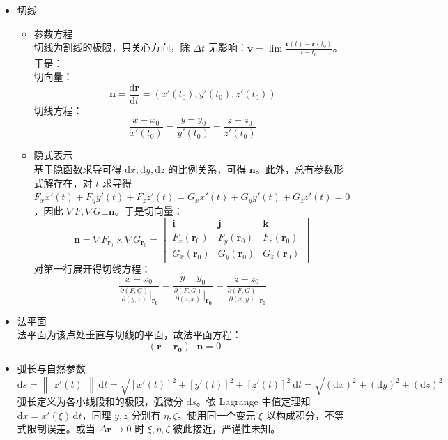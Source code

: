 \documentclass[12pt, a4paper, UTF8, openany]{ctexbook}
\newcommand{\dif}{\mathrm{d}}
\newcommand{\mat}[1]{\mathbf{#1}}
\newcommand{\len}[1]{\begin{Vmatrix}#1\end{Vmatrix}}%
\begin{document}
        \begin{itemize}
            \item 切线
            \begin{itemize}
                \item 参数方程 \\
                切线为割线的极限，只关心方向，除 $\Delta t$ 无影响：$\mat{v} = \lim \frac{\mat{r}(t) - \mat{r}(t_0)}{t - t_0}$。于是：\\
                切向量：
                $$\mat{n} = \frac{\dif \mat{r}}{\dif t} = (x'(t_0), y'(t_0), z'(t_0))$$
                切线方程：
                $$\frac{x - x_0}{x'(t_0)} = \frac{y - y_0}{y'(t_0)} = \frac{z - z_0}{z'(t_0)}$$
                \item 隐式表示 \\
                基于隐函数求导可得 $\dif x, \dif y, \dif z$ 的比例关系，可得 $\mat{n}$。此外，总有参数形式解存在，对 $t$ 求导得 $F_x x'(t) + F_y y'(t) + F_z z'(t) = G_x x'(t) + G_y y'(t) + G_z z'(t) = 0$，因此 $\nabla F, \nabla G \bot \mat{n}$。于是切向量：
                $$\mat{n} = \nabla F_{\mat{r}_0} \times \nabla G_{\mat{r}_0} = \begin{vmatrix}
                    \mat{i} & \mat{j} & \mat{k} \\
                    F_x(\mat{r}_0) & F_y(\mat{r}_0) & F_z(\mat{r}_0) \\
                    G_x(\mat{r}_0) & G_y(\mat{r}_0) & G_z(\mat{r}_0)
                \end{vmatrix}$$
                对第一行展开得切线方程：
                $$\dfrac{x - x_0}{\frac{\partial (F, G)}{\partial (y, z)}|_{\mat{r_0}}} = \dfrac{y - y_0}{\frac{\partial (F, G)}{\partial (z, x)}|_{\mat{r_0}}} = \dfrac{z - z_0}{\frac{\partial (F, G)}{\partial (x, y)}|_{\mat{r_0}}}$$
            \end{itemize}

            \item 法平面 \\
            法平面为该点处垂直与切线的平面，故法平面方程：
            $$(\mat{r} - \mat{r_0}) \cdot \mat{n} = 0$$
            
            \item 弧长与自然参数
            $$\dif s = \len{\mat{r}'(t)} \,\dif t = \sqrt{[x'(t)]^2 + [y'(t)]^2 + [z'(t)]^2} \,\dif t = \sqrt{(\dif x)^2 + (\dif y)^2 + (\dif z)^2}$$
            弧长定义为各小线段和的极限，弧微分 $\dif s$。依 Lagrange 中值定理知 $\dif x = x'(\xi)\,\dif t$，同理 $y, z$ 分别有 $\eta, \zeta$。使用同一个变元 $\xi$ 以构成积分，不等式限制误差。或当 $\Delta\mat{r} \to 0$ 时 $\xi, \eta, \zeta$ 彼此接近，严谨性未知。


\end{itemize}
\end{document}
